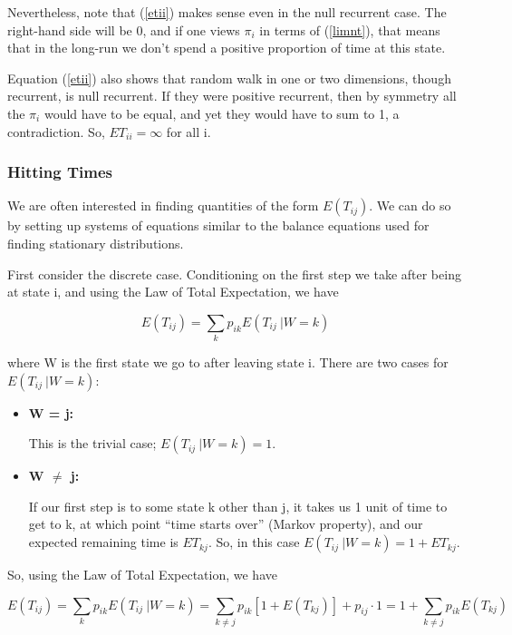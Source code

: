 Nevertheless, note that (\ref{etii}) makes sense even in the null
recurrent case.  The right-hand side will be 0, and if one views $\pi_i$
in terms of (\ref{limnt}), that means that in the long-run we don't
spend a positive proportion of time at this state.

Equation (\ref{etii}) also shows that random walk in one or two
dimensions, though recurrent, is null recurrent.  If they were positive
recurrent, then by symmetry all the $\pi_i$ would have to be equal, and
yet they would have to sum to 1, a contradiction.  So, $ET_{ii} =
\infty$ for all i.

\subsubsection{Hitting Times}

We are often interested in finding quantities of the form $E(T_{ij})$.
We can do so by setting up systems of equations similar to the balance
equations used for finding stationary distributions.

First consider the discrete case.  Conditioning on the first step we
take after being at state i, and using the Law of Total Expectation, we
have

\begin{equation}
E(T_{ij}) = \sum_{k} p_{ik} E(T_{ij} ~| W = k)
\end{equation}

where W is the first state we go to after leaving state i.  There are
two cases for $E(T_{ij} ~| W = k)$:

\begin{itemize}

\item {\bf W = j:}

This is the trivial case; $E(T_{ij} ~| W = k) = 1$.

\item {\bf W $\neq$ j:}

If our first step is to some state k other than j, it takes us 1 unit of
time to get to k, at which point ``time starts over'' (Markov property),
and our expected remaining time is $ET_{kj}$.  So, in this case
$E(T_{ij} ~| W = k) = 1 + ET_{kj}$.

\end{itemize}

So, using the Law of Total Expectation, we have

\begin{equation}
\label{etij0}
E(T_{ij}) = \sum_{k} p_{ik} E(T_{ij} ~| W = k)
= \sum_{k \neq j} p_{ik} [1+E(T_{kj})] + p_{ij} \cdot 1
= 1 + \sum_{k \neq j} p_{ik} E(T_{kj})
\end{equation}

